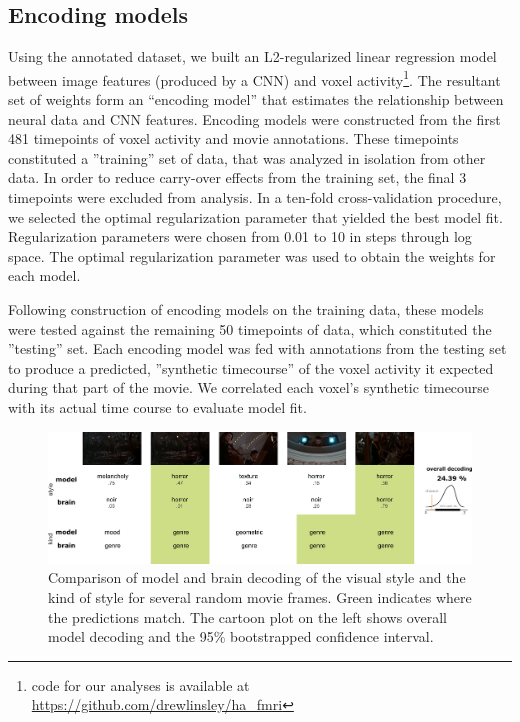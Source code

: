 \documentclass[10pt,twocolumn,letterpaper]{article}
\begin{document}
\subsection{Encoding models}

Using the annotated dataset, we built an L2-regularized linear regression model between image features (produced by a CNN) and voxel activity\footnote{code for our analyses is available at \url{https://github.com/drewlinsley/ha_fmri}}. The resultant set of weights form an ``encoding model'' that estimates the relationship between neural data and CNN features. Encoding models were constructed from the first 481 timepoints of voxel activity and movie annotations. These timepoints constituted a ''training'' set of data, that was analyzed in isolation from other data. In order to reduce carry-over effects from the training set, the final 3 timepoints were excluded from analysis. In a ten-fold cross-validation procedure, we selected the optimal regularization parameter that yielded the best model fit. Regularization parameters were chosen from 0.01 to 10 in steps through log space. The optimal regularization parameter was used to obtain the weights for each model.

Following construction of encoding models on the training data, these models were tested against the remaining 50 timepoints of data, which constituted the ''testing'' set. Each encoding model was fed with annotations from the testing set to produce a predicted, ''synthetic timecourse'' of the voxel activity it expected during that part of the movie. We correlated each voxel's synthetic timecourse with its actual time course to evaluate model fit.


\begin{figure}
\begin{center}
\includegraphics[width=0.8\linewidth]{decoding.png}
\end{center}
   \caption{Comparison of model and brain decoding of the visual style and the kind of style for several random movie frames. Green indicates where the predictions match. The cartoon plot on the left shows overall model decoding and the 95\% bootstrapped confidence interval.}
\label{fig:decoding}
\end{figure}
\end{document}
